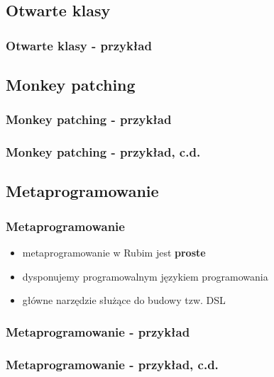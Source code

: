 \documentclass[12t]{beamer}
\begin{document}
\subsection{Otwarte klasy}
\begin{frame}
  \frametitle{Otwarte klasy - przykład}
  
\end{frame}

\subsection{Monkey patching}
\begin{frame}
  \frametitle{Monkey patching - przykład}
  
\end{frame}

\begin{frame}
  \frametitle{Monkey patching - przykład, c.d.}
  
\end{frame}

\subsection{Metaprogramowanie}

\begin{frame}
  \frametitle{Metaprogramowanie}
  \begin{itemize}
  \item metaprogramowanie w Rubim jest \textbf{proste}
  \item dysponujemy programowalnym językiem programowania
  \item główne narzędzie służące do budowy tzw. DSL
  \end{itemize}
\end{frame}

\begin{frame}[fragile]
  \frametitle{Metaprogramowanie - przykład}
  
\end{frame}

\begin{frame}[fragile]
  \frametitle{Metaprogramowanie - przykład, c.d.}
  
\end{frame}
\end{document}
